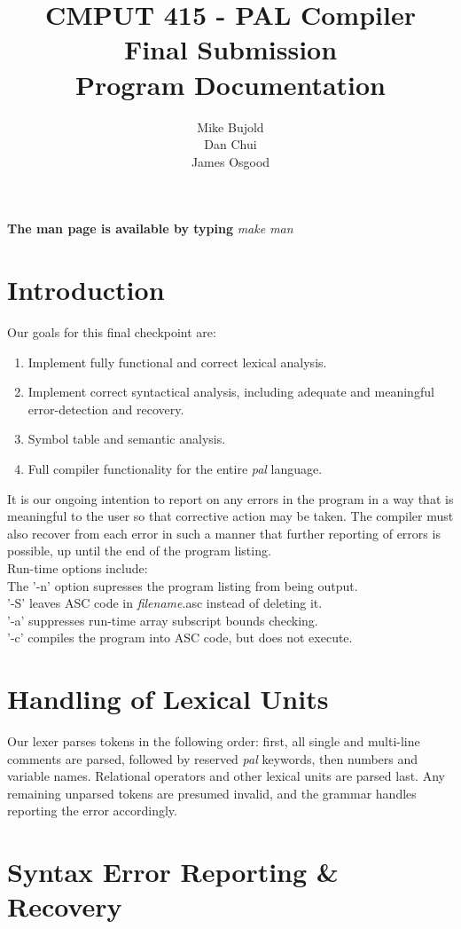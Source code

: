 \documentclass{report}
\title{CMPUT 415 - PAL Compiler\\Final Submission\\Program Documentation}
\author{Mike Bujold \\
Dan Chui \\ 
James Osgood }
\begin{document}
\maketitle
\textbf{The man page is available by typing} \emph{make man}

\section*{Introduction}
Our goals for this final checkpoint are:
\begin{enumerate}
\item Implement fully functional and correct lexical analysis.
\item Implement correct syntactical analysis, including adequate and meaningful error-detection and recovery.
\item Symbol table and semantic analysis.
\item Full compiler functionality for the entire \emph{pal} language.
\end{enumerate}

It is our ongoing intention to report on any errors in the program in a way that is meaningful to the user so that corrective action may be taken. The compiler must also recover from each error in such a manner that further reporting of errors is possible, up until the end of the program listing.\\
Run-time options include:\\
The '-n' option supresses the program listing from being output.\\
'-S' leaves ASC code in \emph{filename}.asc instead of deleting it.\\
'-a' suppresses run-time array subscript bounds checking.\\
'-c' compiles the program into ASC code, but does not execute.\\

\section*{Handling of Lexical Units}
Our lexer parses tokens in the following order: first, all single and multi-line comments are parsed, followed by reserved \emph{pal} keywords, then numbers and variable names. Relational operators and other lexical units are parsed last. Any remaining unparsed tokens are presumed invalid, and the grammar handles reporting the error accordingly.


\section*{Syntax Error Reporting \& Recovery}
\end{document}
